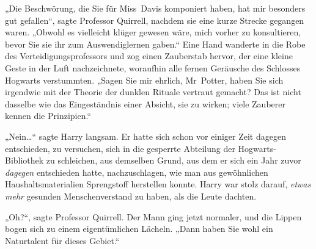 „Die Beschwörung, die Sie für Miss~Davis komponiert haben, hat mir besonders gut gefallen“, sagte Professor Quirrell, nachdem sie eine kurze Strecke gegangen waren. „Obwohl es vielleicht klüger gewesen wäre, mich vorher zu konsultieren, bevor Sie sie ihr zum Auswendiglernen gaben.“ Eine Hand wanderte in die Robe des Verteidigungsprofessors und zog einen Zauberstab hervor, der eine kleine Geste in der Luft nachzeichnete, woraufhin alle fernen Geräusche des Schlosses Hogwarts verstummten. „Sagen Sie mir ehrlich, Mr~Potter, haben Sie sich irgendwie mit der Theorie der dunklen Rituale vertraut gemacht? Das ist nicht dasselbe wie das Eingeständnis einer Absicht, sie zu wirken; viele Zauberer kennen die Prinzipien.“

„Nein…“ sagte Harry langsam. Er hatte sich schon vor einiger Zeit dagegen entschieden, zu versuchen, sich in die gesperrte Abteilung der Hogwarts-Bibliothek zu schleichen, aus demselben Grund, aus dem er sich ein Jahr zuvor \emph{dagegen} entschieden hatte, nachzuschlagen, wie man aus gewöhnlichen Haushaltsmaterialien Sprengstoff herstellen konnte. Harry war stolz darauf, \emph{etwas} \emph{mehr} gesunden Menschenverstand zu haben, als die Leute dachten.

„Oh?“, sagte Professor Quirrell. Der Mann ging jetzt normaler, und die Lippen bogen sich zu einem eigentümlichen Lächeln. „Dann haben Sie wohl ein Naturtalent für dieses Gebiet.“

